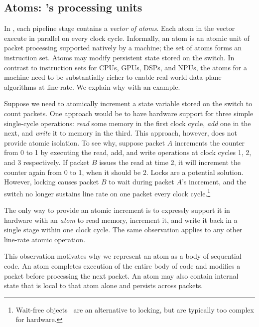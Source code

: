 \subsection{Atoms: \absmachine's processing units}
\label{ss:atoms}

In \absmachine, each pipeline stage contains a {\em vector of
  atoms}. Each atom in the vector execute in parallel on every clock
cycle.  Informally, an atom is an atomic unit of packet processing
supported natively by a \absmachine machine; the set of atoms forms an
instruction set. Atoms may modify persistent state stored on the
switch. In contrast to instruction sets for CPUs, GPUs, DSPs, and
NPUs, the atoms for a \absmachine machine need to be substantially
richer to enable real-world data-plane algorithms at line-rate. We
explain why with an example.

Suppose we need to atomically increment a state variable stored on the
switch to count packets. One approach would be to have hardware
support for three simple single-cycle operations: \textit{read} some
memory in the first clock cycle, \textit{add} one in the next, and
\textit{write} it to memory in the third. This approach, however, does
not provide atomic isolation. To see why, suppose packet $A$
increments the counter from 0 to 1 by executing the read, add, and
write operations at clock cycles 1, 2, and 3 respectively.  If packet
$B$ issues the read at time 2, it will increment the counter again
from 0 to 1, when it should be 2. Locks are a potential
solution. However, locking causes packet $B$ to wait during packet
$A$'s increment, and the switch no longer sustains line rate on one
packet every clock cycle.\footnote{Wait-free
  objects~\cite{herlihy_wait} are an alternative to locking, but are
  typically too complex for hardware.}


The only way to provide an atomic increment is to expressly support it
in hardware with an {\em atom} to read memory, increment it, and write
it back in a single stage within one clock cycle. The same observation
applies to any other line-rate atomic operation.  

This observation motivates why we represent an atom as a body of
sequential code. An atom completes execution of the entire body of
code and modifies a packet before processing the next packet.  An atom
may also contain internal state that is local to that atom alone and
persists across packets.

